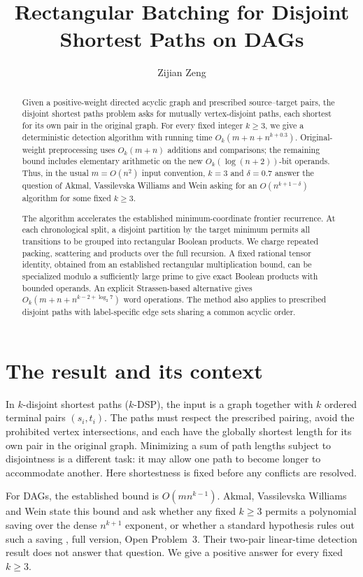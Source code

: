 \documentclass[acmlarge,11pt,screen,nonacm]{acmart}
\title{Rectangular Batching for Disjoint Shortest Paths on DAGs}
\author{Zijian Zeng}
\affiliation{\institution{UCSI University}\city{}\country{Malaysia}}
\begin{document}
\begin{abstract}
\normalsize
Given a positive-weight directed acyclic graph and prescribed source--target
pairs, the disjoint shortest paths problem asks for mutually vertex-disjoint
paths, each shortest for its own pair in the original graph. For every fixed
integer $k\geq3$, we give a deterministic detection algorithm with running time
$O_k(m+n+n^{k+0.3})$. Original-weight preprocessing uses $O_k(m+n)$ additions
and comparisons; the remaining bound includes elementary arithmetic on the
new $O_k(\log(n+2))$-bit operands. Thus, in the usual $m=O(n^2)$ input
convention, $k=3$ and $\delta=0.7$ answer the question of Akmal, Vassilevska
Williams and Wein asking for an $O(n^{k+1-\delta})$ algorithm for some fixed
$k\geq3$.

The algorithm accelerates the established minimum-coordinate frontier
recurrence. At each chronological split, a disjoint partition by the target
minimum permits all transitions to be grouped into rectangular Boolean
products. We charge repeated packing, scattering and products over the full
recursion. A fixed rational tensor identity, obtained from an established
rectangular multiplication bound, can be specialized modulo a sufficiently
large prime to give exact Boolean products with bounded operands. An explicit
Strassen-based alternative gives $O_k(m+n+n^{k-2+\log_2 7})$ word operations.
The method also applies to prescribed disjoint paths with label-specific edge
sets sharing a common acyclic order.
\end{abstract}
\maketitle
\clearpage

\section{The result and its context}
In $k$-disjoint shortest paths ($k$-DSP), the input is a graph together with
$k$ ordered terminal pairs $(s_i,t_i)$. The paths must respect the prescribed
pairing, avoid the prohibited vertex intersections, and each have the globally
shortest length for its own pair in the original graph. Minimizing a sum of
path lengths subject to disjointness is a different task: it may allow one
path to become longer to accommodate another. Here shortestness is fixed
before any conflicts are resolved.

For DAGs, the established bound is $O(mn^{k-1})$. Akmal, Vassilevska Williams
and Wein state this bound and ask whether any fixed $k\geq3$ permits a
polynomial saving over the dense $n^{k+1}$ exponent, or whether a standard
hypothesis rules out such a saving \cite{AVW24}, full version, Open Problem~3.
Their two-pair linear-time detection result does not answer that question.
We give a positive answer for every fixed $k\geq3$.
\end{document}
